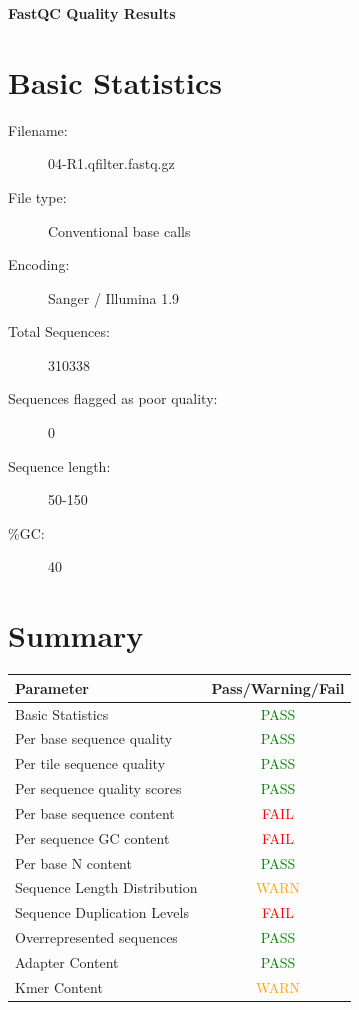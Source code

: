 \documentclass{article}
\begin{document}
\renewcommand{\baselinestretch}{1.0}
\begin{center}
\Large{\textbf{FastQC Quality Results}}
\end{center}
\section{Basic Statistics}
\begin{description}
\item[Filename:]
04{-}R1.qfilter.fastq.gz
\item[File type:]
Conventional base calls
\item[Encoding:]
Sanger / Illumina 1.9
\item[Total Sequences:]
310338
\item[Sequences flagged as poor quality:]
0
\item[Sequence length:]
50{-}150
\item[\%GC:]
40
\end{description}


\section{Summary}
\begin{tabular}{p{5cm}|c}
Parameter&Pass/Warning/Fail\\
\hline
Basic Statistics&\textcolor{green}{PASS}\\
Per base sequence quality&\textcolor{green}{PASS}\\
Per tile sequence quality&\textcolor{green}{PASS}\\
Per sequence quality scores&\textcolor{green}{PASS}\\
Per base sequence content&\textcolor{red}{FAIL}\\
Per sequence GC content&\textcolor{red}{FAIL}\\
Per base N content&\textcolor{green}{PASS}\\
Sequence Length Distribution&\textcolor{orange}{WARN}\\
Sequence Duplication Levels&\textcolor{red}{FAIL}\\
Overrepresented sequences&\textcolor{green}{PASS}\\
Adapter Content&\textcolor{green}{PASS}\\
Kmer Content&\textcolor{orange}{WARN}\\
\end{tabular}
\end{document}
